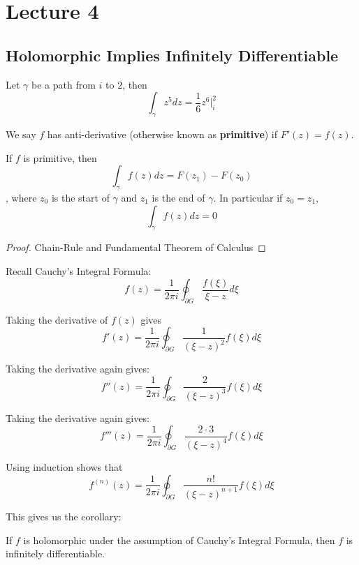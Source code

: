 \section{Lecture 4}

\subsection{Holomorphic Implies Infinitely Differentiable}

\begin{example}
Let $\gamma$ be a path from $i$ to $2$, then
\[\int_\gamma z^5 dz = \frac{1}{6} z^6 |_i^2\]
\end{example}

\begin{definition}
We say $f$ has anti-derivative (otherwise known as \textbf{primitive}) if $F'(z) = f(z)$.
\end{definition}

\begin{proposition}
    If $f$ is primitive, then
    \[\int_\gamma f(z) dz = F(z_1) - F(z_0)\]
    , where $z_0$ is the start of $\gamma$ and $z_1$ is the end of $\gamma$. In particular if $z_0 = z_1$,
    \[\int_\gamma f(z) dz = 0\]
\end{proposition}

\begin{proof}
Chain-Rule and Fundamental Theorem of Calculus
\end{proof}

Recall Cauchy's Integral Formula:
\[f(z) = \frac{1}{2\pi i} \oint_{\partial G} \frac{f(\xi)}{\xi - z} d\xi\]

Taking the derivative of $f(z)$ gives
\[f'(z) = \frac{1}{2\pi i}  \oint_{\partial G} \frac{1}{(\xi - z)^2} f(\xi) d\xi\]

Taking the derivative again gives:
\[f''(z) = \frac{1}{2\pi i}  \oint_{\partial G} \frac{2}{(\xi - z)^3} f(\xi) d\xi\]

Taking the derivative again gives:
\[f'''(z) = \frac{1}{2\pi i}  \oint_{\partial G} \frac{2 \cdot 3}{(\xi - z)^4} f(\xi) d\xi\]

Using induction shows that
\[f^{(n)}(z) = \frac{1}{2 \pi i} \oint_{\partial G} \frac{n!}{(\xi - z)^{n+1}} f(\xi) d\xi\]

This gives us the corollary:

\begin{corollary}
    If $f$ is holomorphic under the assumption of Cauchy's Integral Formula, then $f$ is infinitely differentiable.
\end{corollary}

